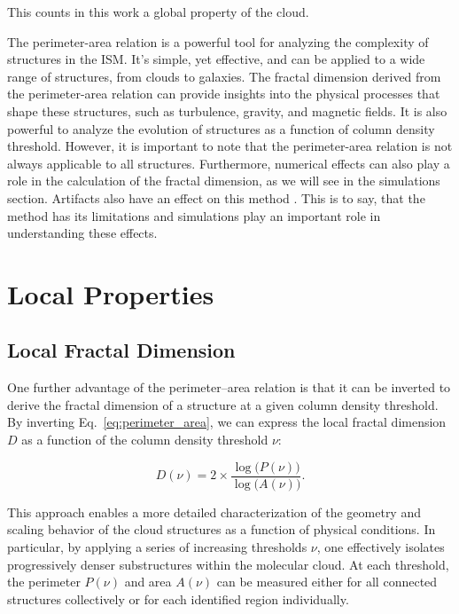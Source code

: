 This counts in this work a global property of the cloud.

The perimeter-area relation is a powerful tool for analyzing the complexity of structures in the ISM. It's simple, yet effective, and can be applied to a wide range of structures, from clouds to galaxies. The fractal dimension derived from the perimeter-area relation can provide insights into the physical processes that shape these structures, such as turbulence, gravity, and magnetic fields. It is also powerful to analyze the evolution of structures as a function of column density threshold.
However, it is important to note that the perimeter-area relation is not always applicable to all structures. Furthermore, numerical effects can also play a role in the calculation of the fractal dimension, as we will see in the simulations section. Artifacts also have an effect on this method \cite{imre2006artificial}. This is to say, that the method has its limitations and simulations play an important role in understanding these effects. 

\section{Local Properties}

\subsection{Local Fractal Dimension}

One further advantage of the perimeter–area relation is that it can be inverted to derive the fractal dimension of a structure at a given column density threshold. By inverting Eq.~\ref{eq:perimeter_area}, we can express the local fractal dimension $D$ as a function of the column density threshold $\nu$:

\begin{equation}
    \label{eq:local_fractal_dimension}
    D(\nu) = 2 \times \frac{\log\bigl(P(\nu)\bigr)}{\log\bigl(A(\nu)\bigr)}.
\end{equation}

This approach enables a more detailed characterization of the geometry and scaling behavior of the cloud structures as a function of physical conditions. In particular, by applying a series of increasing thresholds $\nu$, one effectively isolates progressively denser substructures within the molecular cloud. At each threshold, the perimeter $P(\nu)$ and area $A(\nu)$ can be measured either for all connected structures collectively or for each identified region individually.

